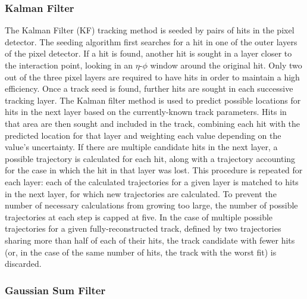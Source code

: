 \subsubsection{Kalman Filter}
\label{evReco:KF}
The Kalman Filter (KF) tracking method \cite{CMS-NOTE-2006-041} 
is seeded \cite{CMS-NOTE-2006-026}
by pairs of hits in the pixel detector.  
The seeding algorithm first searches for a hit 
in one of the outer layers of the pixel detector.  
If a hit is found, another hit is sought in a 
layer closer to the interaction point, 
looking in an $\eta$-$\phi$ window around 
the original hit.  
Only two out of the three pixel layers are 
required to have hits 
in order to maintain a high efficiency.  
Once a track seed is found, 
further hits are sought in each successive tracking layer. 
The Kalman filter method is used to predict possible 
locations for hits in the next layer based on 
the currently-known track parameters. %
Hits in that area are then sought and included 
in the track, combining each hit with the 
predicted location for that layer and weighting 
each value depending on the value's uncertainty.  
If there are multiple candidate hits in the next layer, 
a possible trajectory is calculated for each hit, 
along with a trajectory accounting for the case 
in which the hit in that layer was lost.  
This procedure is repeated for each layer: 
each of the calculated trajectories for a given layer 
is matched to hits in the next layer, 
for which new trajectories are calculated.  
To prevent the number of necessary calculations 
from growing too large, 
the number of possible trajectories at each step 
is capped at five.  
In the case of multiple possible trajectories 
for a given fully-reconstructed track, 
defined by two trajectories sharing more than 
half of each of their hits,
the track candidate with fewer hits 
(or, in the case of the same number of hits, 
the track with the worst fit)
is discarded.  

\subsubsection{Gaussian Sum Filter}
\label{evReco:GSF}

